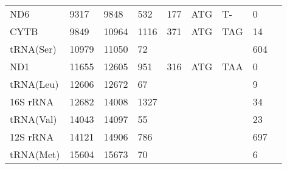\documentclass[../DISSERTACAO_MAIN.tex]{subfiles}
\begin{document}
\begin{longtable}{llllllllllllllllllllll}
			ND6          & \multicolumn{2}{l}{9317}    & \multicolumn{2}{l}{9848}    & \multicolumn{2}{l}{532}         & \multicolumn{3}{l}{177}                       & \multicolumn{3}{l}{ATG}   & \multicolumn{3}{l}{T-}      & \multicolumn{3}{l}{0}           & \multicolumn{3}{l}{}         \\
			CYTB         & \multicolumn{2}{l}{9849}    & \multicolumn{2}{l}{10964}   & \multicolumn{2}{l}{1116}        & \multicolumn{3}{l}{371}                       & \multicolumn{3}{l}{ATG}   & \multicolumn{3}{l}{TAG}     & \multicolumn{3}{l}{14}          & \multicolumn{3}{l}{}         \\
			tRNA(Ser)    & \multicolumn{2}{l}{10979}   & \multicolumn{2}{l}{11050}   & \multicolumn{2}{l}{72}          & \multicolumn{3}{l}{}                          & \multicolumn{3}{l}{}      & \multicolumn{3}{l}{}        & \multicolumn{3}{l}{604}         & \multicolumn{3}{l}{}         \\
			ND1          & \multicolumn{2}{l}{11655}   & \multicolumn{2}{l}{12605}   & \multicolumn{2}{l}{951}         & \multicolumn{3}{l}{316}                       & \multicolumn{3}{l}{ATG}   & \multicolumn{3}{l}{TAA}     & \multicolumn{3}{l}{0}           & \multicolumn{3}{l}{}         \\
			tRNA(Leu)    & \multicolumn{2}{l}{12606}   & \multicolumn{2}{l}{12672}   & \multicolumn{2}{l}{67}          & \multicolumn{3}{l}{}                          & \multicolumn{3}{l}{}      & \multicolumn{3}{l}{}        & \multicolumn{3}{l}{9}           & \multicolumn{3}{l}{}         \\
			16S 				rRNA & \multicolumn{2}{l}{12682}   & \multicolumn{2}{l}{14008}   & \multicolumn{2}{l}{1327}        & \multicolumn{3}{l}{}                          & \multicolumn{3}{l}{}      & \multicolumn{3}{l}{}        & \multicolumn{3}{l}{34}          & \multicolumn{3}{l}{}         \\
			tRNA(Val)    & \multicolumn{2}{l}{14043}   & \multicolumn{2}{l}{14097}   & \multicolumn{2}{l}{55}          & \multicolumn{3}{l}{}                          & \multicolumn{3}{l}{}      & \multicolumn{3}{l}{}        & \multicolumn{3}{l}{23}          & \multicolumn{3}{l}{}         \\
			12S 				rRNA & \multicolumn{2}{l}{14121}   & \multicolumn{2}{l}{14906}   & \multicolumn{2}{l}{786}         & \multicolumn{3}{l}{}                          & \multicolumn{3}{l}{}      & \multicolumn{3}{l}{}        & \multicolumn{3}{l}{697}         & \multicolumn{3}{l}{}         \\
			tRNA(Met)    & \multicolumn{2}{l}{15604}   & \multicolumn{2}{l}{15673}   & \multicolumn{2}{l}{70}          & \multicolumn{3}{l}{}                          & \multicolumn{3}{l}{}      & \multicolumn{3}{l}{}        & \multicolumn{3}{l}{6}           & \multicolumn{3}{l}{}         \\

\end{longtable}
\end{document}
